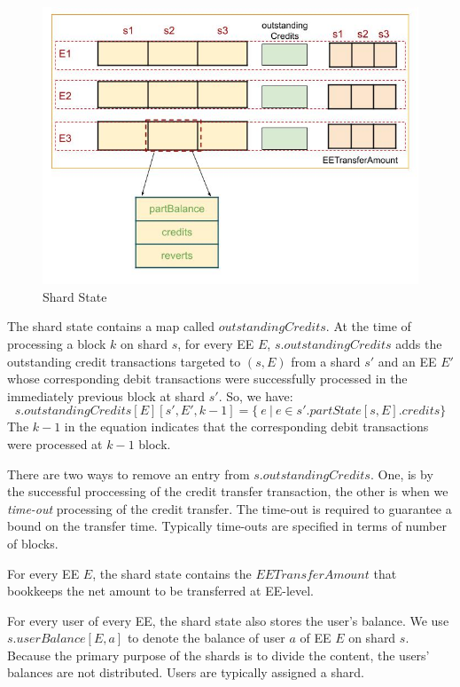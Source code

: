\documentclass{article}
\begin{document}
\begin{figure}[h]
	\includegraphics[scale=0.5]{state.jpg}
	\caption{Shard State\label{fig:shardstate}}
\end{figure}
	
The shard state contains a map called $outstandingCredits$. At the time of processing a block $k$ on shard $s$, for every EE $E$, $s.outstandingCredits$ adds the outstanding credit transactions targeted to $(s,E)$ from a shard $s'$ and an EE $E'$ whose corresponding debit transactions were successfully processed in the immediately previous block at shard $s'$. So, we have:
\[
	s.outstandingCredits[E][s', E', k-1] = \{~e ~|~ e \in s'.partState[s,E].credits\}
\]
The $k-1$ in the equation indicates that the corresponding debit transactions were processed at $k-1$ block. 

There are two ways to remove an entry from $s.outstandingCredits$. One, is by the successful proccessing of the credit transfer transaction, the other is when we {\em time-out} processing of the credit transfer. The time-out is required to guarantee a bound on the transfer time. Typically time-outs are specified in terms of number of blocks.

For every EE $E$, the shard state contains the $EETransferAmount$ that bookkeeps the net amount to be transferred at EE-level.

For every user of every EE, the shard state also stores the user's balance. We use $s.userBalance[E,a]$ to denote the balance of user $a$ of EE $E$ on shard $s$. Because the primary purpose of the shards is to divide the content, the users' balances are not distributed. Users are typically assigned a shard.
\end{document}
